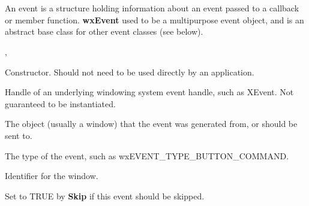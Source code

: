 \section{}\label{wxevent}

An event is a structure holding information about an event passed to a
callback or member function. {\bf wxEvent} used to be a multipurpose
event object, and is an abstract base class for other event classes (see below).




,\rtfsp
{}




Constructor. Should not need to be used directly by an application.



Handle of an underlying windowing system event handle, such as
XEvent. Not guaranteed to be instantiated.



The object (usually a window) that the event was generated from,
or should be sent to.



The type of the event, such as wxEVENT\_TYPE\_BUTTON\_COMMAND.



Identifier for the window.



Set to TRUE by {\bf Skip} if this event should be skipped.



